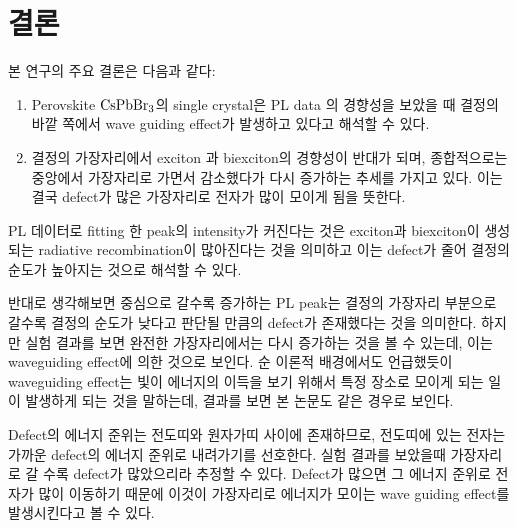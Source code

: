 \newpage

\section{결론	}
본 연구의 주요 결론은 다음과 같다:
\begin{enumerate}
	\item Perovskite $\rm CsPbBr_3$의 single crystal은 PL data 의 경향성을 보았을 때 결정의 바깥 쪽에서 wave guiding effect가 발생하고 있다고 해석할 수 있다.
	\item 결정의 가장자리에서 exciton 과 biexciton의 경향성이 반대가 되며, 종합적으로는 중앙에서 가장자리로 가면서 감소했다가 다시 증가하는 추세를 가지고 있다. 이는 결국 defect가 많은 가장자리로 전자가 많이 모이게 됨을 뜻한다.
\end{enumerate}
PL 데이터로 fitting 한 peak의 intensity가 커진다는 것은 exciton과 biexciton이 생성되는 radiative recombination이 많아진다는 것을 의미하고 이는 defect가 줄어 결정의 순도가 높아지는 것으로 해석할 수 있다.

반대로 생각해보면 중심으로 갈수록 증가하는 PL peak는 결정의 가장자리 부분으로 갈수록 결정의 순도가 낮다고 판단될 만큼의 defect가 존재했다는 것을 의미한다. 하지만 실험 결과를 보면 완전한 가장자리에서는 다시 증가하는 것을 볼 수 있는데, 이는 waveguiding effect에 의한 것으로 보인다. 순
이론적 배경에서도 언급했듯이 waveguiding effect는 빛이 에너지의 이득을 보기 위해서 특정 장소로 모이게 되는 일이 발생하게 되는 것을 말하는데, 결과를 보면 본 논문도 같은 경우로 보인다.

Defect의 에너지 준위는 전도띠와 원자가띠 사이에 존재하므로, 전도띠에 있는 전자는 가까운 defect의 에너지 준위로 내려가기를 선호한다. 실험 결과를 보았을때 가장자리로 갈 수록 defect가 많았으리라 추정할 수 있다. Defect가 많으면 그 에너지 준위로 전자가 많이 이동하기 때문에 이것이 가장자리로 에너지가 모이는 wave guiding effect를 발생시킨다고 볼 수 있다.